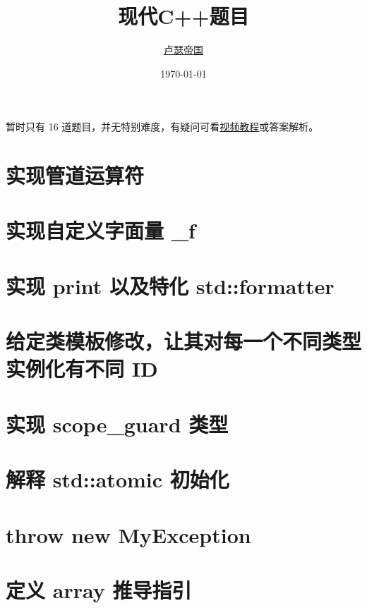 \documentclass[11pt,fancyhdr]{ctexart}
\title{现代C++题目}
\author{\href{https://github.com/Mq-b/Loser-HomeWork}{卢瑟帝国}\\}
\date{\today}
\begin{document}
\maketitle

\tableofcontents
\newpage

暂时只有 16 道题目，并无特别难度，有疑问可看\href{https://www.bilibili.com/video/BV1Zj411r7eP/}{视频教程}或答案解析。


\section{实现管道运算符}


\section{实现自定义字面量 \_f}

\section{实现 print 以及特化 std::formatter}



\section{给定类模板修改，让其对每一个不同类型实例化有不同 ID}


\section{实现 scope\_guard 类型}


\section{解释 std::atomic 初始化}


\section{throw new MyException}


\section{定义 array 推导指引}

\end{document}
